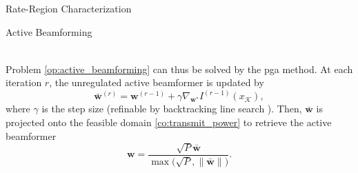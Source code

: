\documentclass[journal]{IEEEtran}
\begin{document}
\begin{section}{Rate-Region Characterization}
\begin{subsection}{Active Beamforming}
\begin{figure*}[!b]
\begin{align}
				\label{eq:weighted_sum_mutual_information_gradient}
			\end{align}
		\end{figure*}
		Problem \eqref{op:active_beamforming} can thus be solved by the \gls{pga} method.
		At each iteration $r$, the unregulated active beamformer is updated by
		\begin{equation}
			\bar{\boldsymbol{w}}^{(r)} = \boldsymbol{w}^{(r-1)}+\gamma\nabla_{\boldsymbol{w}^*} I^{(r-1)}(x_{\mathcal{K}}),
			\label{eq:beamforming_gradient_ascent}
		\end{equation}
		where $\gamma$ is the step size (refinable by backtracking line search \cite[Section 9.2]{Boyd2004}).
		Then, $\bar{\boldsymbol{w}}$ is projected onto the feasible domain \eqref{co:transmit_power} to retrieve the active beamformer
		\begin{equation}
			\boldsymbol{w} = \frac{\sqrt{P} \bar{\boldsymbol{w}}}{\max\bigl(\sqrt{P},\lVert\bar{\boldsymbol{w}}\rVert\bigr)}.
			\label{eq:beamforming_projection}
		\end{equation}


\end{subsection}
\end{section}
\end{document}
